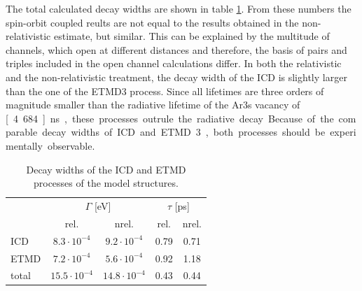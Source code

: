 The total calculated decay widths are shown in table
\ref{table:arxe_widths_model}. From these numbers the spin-orbit coupled
reults are not equal to the results obtained in the non-relativistic estimate,
but similar. This can be explained by the multitude of channels, which
open at different distances and therefore, the basis of pairs and triples
included in the open channel calculations differ. In both the relativistic and
the non-relativistic treatment,
the decay width of the \ac{ICD} is slightly larger than the one of the
\ac{ETMD}3 process. Since all lifetimes are three orders of magnitude smaller
than the radiative lifetime of the Ar3s vacancy of \unit[4.684]{ns},
these processes outrule the radiative decay.
Because of the comparable decay widths of \ac{ICD} and \ac{ETMD}3, both
processes should be experimentally observable.

\begin{table}[bt]
 \centering
 \caption{Decay widths of the ICD and ETMD processes of the model structures.}
 \begin{tabular}{lcccc}
  \toprule
          & \multicolumn{2}{c}{$\Gamma$ [eV]} & \multicolumn{2}{c}{$\tau$ [ps]}\\
          & rel.               & nrel.              & rel. & nrel. \\
  \midrule
   ICD    & $8.3\cdot 10^{-4}$ & $9.2\cdot 10^{-4}$ & 0.79 & 0.71\\
   ETMD   & $7.2\cdot 10^{-4}$ & $5.6\cdot 10^{-4}$ & 0.92 & 1.18\\
   total  & $15.5\cdot 10^{-4}$& $14.8\cdot 10^{-4}$& 0.43 & 0.44\\
  \bottomrule
 \end{tabular}
 \label{table:arxe_widths_model}
\end{table}

